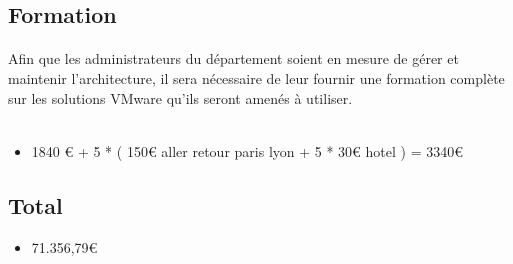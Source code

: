 \subsection{Formation}

\paragraph{} Afin que les administrateurs du département soient en mesure de gérer et maintenir l'architecture, il sera nécessaire de leur fournir une formation complète sur les solutions VMware qu'ils seront amenés à utiliser.
\\~
\begin{itemize}
	\item 1840 € + 5 * ( 150€ aller retour paris lyon + 5 * 30€ hotel ) = 3340€
\end{itemize}


\subsection{Total}

\begin{itemize}
	\item 71.356,79€
\end{itemize}